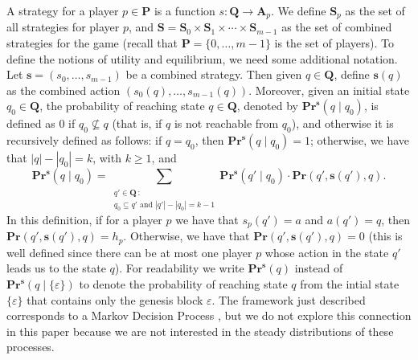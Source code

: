\documentclass[a4paper,english,cleveref, autoref,numberwithinsect]{lipics-v2019}
\newcommand{\pr}{\mathbf{Pr}}
\newcommand{\bs}{\mathbf{s}}
\newcommand{\bP}{\mathbf{P}}
\newcommand{\bA}{\mathbf{A}}
\newcommand{\bS}{\mathbf{S}}
\newcommand{\bH}{\mathbf{H}}
\newcommand{\bQ}{\mathbf{Q}}
\begin{document}
A strategy for a player $p \in \bP$ is a function $s : \bQ \rightarrow \bA_p$.
We define $\bS_p$ as the set of all strategies for player $p$, and $\bS = \bS_0 \times \bS_{1} \times \cdots \times \bS_{m-1}$ as the set of combined strategies for the game (recall 
that $\bP = \{0, \ldots, m-1\}$ is the set of players).
To define the notions of utility and equilibrium, we need some additional notation.
Let $\bs = (s_0, \ldots, s_{m-1})$ be a combined strategy.
Then given $q \in \bQ$, define $\bs(q)$ as the combined action $(s_0(q), \ldots, s_{m-1}(q))$. Moreover, given an initial state $q_0 \in \bQ$,
the probability of reaching state $q \in \bQ$, denoted by $\pr^{\bs}(q \mid q_0)$, is defined as 0 if $q_0 \not\subseteq q$ (that is, if $q$ is not reachable from $q_0$), and otherwise it is recursively defined as follows: if $q = q_0$, then $\pr^{\bs}(q \mid q_0) = 1$; otherwise, we have that $|q| - |q_0| = k$, with $k \geq 1$, and
$$
\pr^{\bs}(q \mid q_0) =
\sum_{\substack{q' \in \bQ \,:\\ q_0 \subseteq q' \text{ and } |q'| - |q_0| = k-1}}
 \pr^{\bs}(q' \mid q_0) \cdot \pr(q', \bs(q'), q).
 $$
In this definition, if for a player $p$ we have that $s_p(q') = a$ and $a(q') = q$, then $\pr(q', \bs(q'), q) = h_p$. Otherwise, we have that $\pr(q', \bs(q'), q) = 0$ 
(this is well defined since there can be at most one player $p$ whose action in the state $q'$ leads us to the state $q$). 
For readability we write $\pr^{\bs}(q)$ instead of $\pr^{\bs}(q \mid \{\varepsilon\})$ to denote the probability of reaching state $q$ from the intial state $\{\varepsilon\}$ that contains 
only the genesis block  $\varepsilon$. 
The framework just described corresponds to a Markov Decision Process \cite{MU05}, but we do not explore this connection in this paper because we are not interested in the steady distributions of these processes. 
\end{document}
